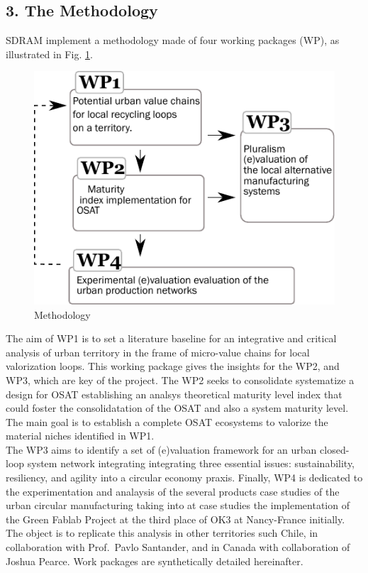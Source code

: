 \documentclass[
  11pt,
  a4paperpaper,
  onecolumn]{article}
\begin{document}
\hypertarget{the-methodology}{%
\subsection{3. The Methodology}\label{the-methodology}}

SDRAM implement a methodology made of four working packages (WP), as
illustrated in Fig. \ref{fig:WPs}.

\begin{figure}
\centering
    \includegraphics[width=\linewidth]{Figures/WPs.pdf}
    \caption{Methodology}
    \label{fig:WPs}
\end{figure}

The aim of WP1 is to set a literature baseline for an integrative and
critical analysis of urban territory in the frame of micro-value chains
for local valorization loops. This working package gives the insights
for the WP2, and WP3, which are key of the project. The WP2 seeks to
consolidate systematize a design for OSAT establishing an analsys
theoretical maturity level index that could foster the consolidatation
of the OSAT and also a system maturity level. The main goal is to
establish a complete OSAT ecosystems to valorize the material niches
identified in WP1.\\
The WP3 aims to identify a set of (e)valuation framework for an urban
closed-loop system network integrating integrating three essential
issues: sustainability, resiliency, and agility into a circular economy
praxis. Finally, WP4 is dedicated to the experimentation and analaysis
of the several products case studies of the urban circular manufacturing
taking into at case studies the implementation of the Green Fablab
Project at the third place of OK3 at Nancy-France initially. The object
is to replicate this analysis in other territories such Chile, in
collaboration with Prof.~Pavlo Santander, and in Canada with
collaboration of Joshua Pearce. Work packages are synthetically detailed
hereinafter.
\end{document}
